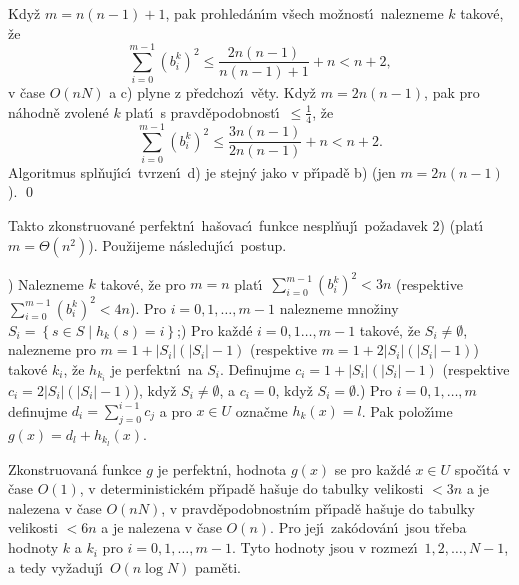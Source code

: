 \flushpar Kdy\v z $m=n\left(n-1\right)+1$, pak prohled\'an\'\i m v\v sech mo\v znost\'\i\ 
nalezne\-me $k$ takov\'e, \v ze $$\sum_{i=0}^{m-1}\left(b_i^k\right)^2\le\frac {
2n\left(n-1\right)}{n\left(n-1\right)+1}+n<n+2,$$ v 
\v case $O\left(nN\right)$ a c) plyne z p\v redchoz\'\i\ v\v ety. Kdy\v z 
$m=2n\left(n-1\right)$, pak pro n\'ahodn\v e zvolen\'e $k$ plat\'\i\ s 
pravd\v epodobnost\'\i\ $\le\frac 14$, \v ze 
$$\sum_{i=0}^{m-1}\left(b_i^k\right)^2\le\frac {3n\left(n-1\right)}{2n\left(n-1\right)}+n<n+2.$$
Algoritmus spl\v nuj\'\i c\'\i\ tvrzen\'\i\ d) je stejn\'y jako 
v p\v r\'\i pad\v e b) (jen $m=2n\left(n-1\right)$). \qed
\enddemo

\flushpar Takto zkonstruovan\'e perfektn\'\i\ ha\v sovac\'\i\ funkce 
nespl\v nuj\'\i\ po\v za\-davek 2) (plat\'\i\ $m=\Theta \left(n^2\right)$).  Pou\v zijeme n\'asleduj\'\i c\'\i\ 
postup. 
\medskip

) Nalezneme $k$ takov\'e, \v ze pro $m=n$ plat\'\i\ 
$\sum_{i=0}^{m-1}\left(b_i^k\right)^2<3n$ (respektive $\sum_{i=0}^{m-1}\left(b_i^
k\right)^2<4n$).  Pro 
$i=0,1,\dots,m-1$ nalezneme mno\v ziny 
$S_i=\left\{s\in S\mid h_k\left(s\right)=i\right\}$;\newline 
2) Pro ka\v zd\'e $i=0,1\dots,m-1$ takov\'e, \v ze $S_i\ne\emptyset$, 
nalezneme pro $m=1+|S_i|\left(|S_i|-1\right)$ (respektive $m=1+2|S_i|\left(|S_i|-
1\right)$) 
takov\'e $k_i$, \v ze $h_{k_i}$ je perfektn\'\i\ na $S_i$. Definujme 
$c_i=1+|S_i|\left(|S_i|-1\right)$ (respektive $c_i=2|S_i|\left(|S_i|-1\right)$), kdy\v z 
$S_i\ne\emptyset$, a $c_i=0$, kdy\v z 
$S_i=\emptyset$.\newline 
3) Pro $i=0,1,\dots,m$ definujme $d_i=\sum_{j=0}^{i-1}c_j$ a pro $
x\in U$ 
ozna\v cme $h_k\left(x\right)=l$. Pak polo\v z\'\i me $g\left(x\right)=d_l+h_{k_l}\left(x\right)$.

Zkonstruovan\'a funkce $g$ je perfektn\'\i , 
hodnota $g\left(x\right)$ se pro ka\v zd\'e $x\in U$ spo\v c\'\i t\'a v \v case $
O\left(1\right)$, 
v deterministick\'em p\v r\'\i pa\-d\v e ha\v suje do tabulky velikosti 
$<3n$ a je nalezena v \v case $O\left(nN\right)$, v pravd\v epodobnostn\'\i m 
p\v r\'\i pa\-d\v e ha\v suje do tabulky velikosti $<6n$ a je nalezena 
v \v case $O\left(n\right)$. Pro jej\'\i\ zak\'odov\'an\'\i\ jsou t\v reba hodnoty $
k$ a 
$k_i$ pro $i=0,1,\dots,m-1$. Tyto hodnoty jsou v rozmez\'\i\ 
$1,2,\dots,N-1$, a tedy vy\v zaduj\'\i\ $O\left(n\log N\right)$ pam\v eti.
\endproclaim

